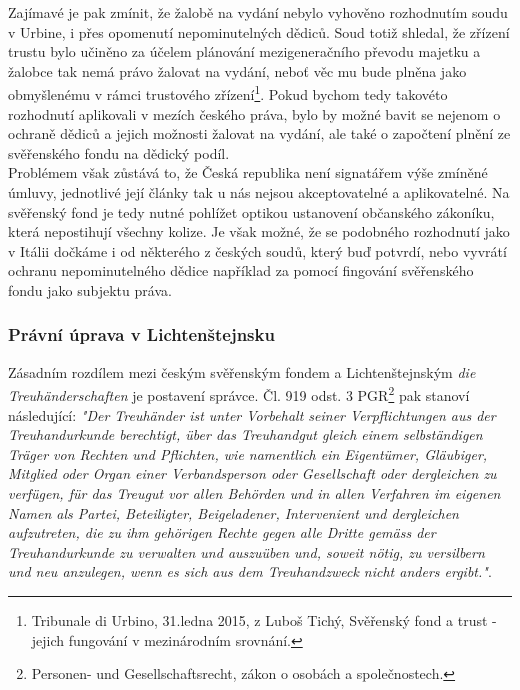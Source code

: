 \documentclass{article}
\begin{document}
Zajímavé je pak zmínit, že žalobě na vydání nebylo vyhověno rozhodnutím soudu v Urbine, i přes opomenutí nepominutelných dědiců. Soud totiž shledal, že zřízení trustu bylo učiněno za účelem plánování mezigeneračního převodu majetku a žalobce tak nemá právo žalovat na vydání, neboť věc mu bude plněna jako obmyšlenému v rámci trustového zřízení\footnote{Tribunale di Urbino, 31.ledna 2015, z Luboš Tichý, Svěřenský fond a trust - jejich fungování v mezinárodním srovnání.}. Pokud bychom tedy takovéto rozhodnutí aplikovali v mezích českého práva, bylo by možné bavit se nejenom o ochraně dědiců a jejich možnosti žalovat na vydání, ale také o započtení plnění ze svěřenského fondu na dědický podíl.\\

Problémem však zůstává to, že Česká republika není signatářem výše zmíněné úmluvy, jednotlivé její články tak u nás nejsou akceptovatelné a aplikovatelné. Na svěřenský fond je tedy nutné pohlížet optikou ustanovení občanského zákoníku, která nepostihují všechny kolize. Je však možné, že se podobného rozhodnutí jako v Itálii dočkáme i od některého z českých soudů, který buď potvrdí, nebo vyvrátí ochranu nepominutelného dědice například za pomocí fingování svěřenského fondu jako subjektu práva.\\




\subsubsection{Právní úprava v Lichtenštejnsku}

Zásadním rozdílem mezi českým svěřenským fondem a Lichtenštejnským \textit{die Treuhänderschaften} je postavení správce. Čl. 919 odst. 3 PGR\footnote{Personen- und Gesellschaftsrecht, zákon o osobách a společnostech.} pak stanoví následující: \textit{"Der Treuhänder ist unter Vorbehalt seiner Verpflichtungen aus der Treuhandurkunde berechtigt, über das Treuhandgut gleich einem selbständigen Träger von Rechten und Pflichten, wie namentlich ein Eigentümer, Gläubiger, Mitglied oder Organ einer Verbandsperson oder Gesellschaft oder dergleichen zu verfügen, für das Treugut vor allen Behörden und in allen Verfahren im eigenen Namen als Partei, Beteiligter, Beigeladener, Intervenient und dergleichen aufzutreten, die zu ihm gehörigen Rechte gegen alle Dritte gemäss der Treuhandurkunde zu verwalten und auszuüben und, soweit nötig, zu versilbern und neu anzulegen, wenn es sich aus dem Treuhandzweck nicht anders ergibt."}.\\
\end{document}
